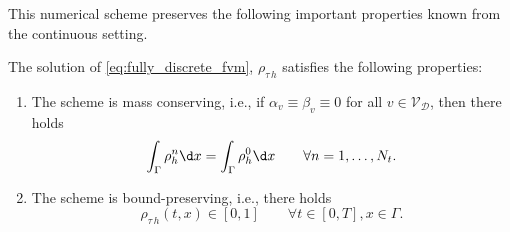This numerical scheme preserves the following important properties known from the continuous setting.
\begin{theorem}
    The solution of \eqref{eq:fully_discrete_fvm}, $\rho_{\tau\,h}$ satisfies the following properties:
    \begin{enumerate}[label=\roman*)]
        \item The scheme is mass conserving, i.e., if $\alpha_v\equiv \beta_v\equiv 0$ for all $v\in \mathcal{V}_{\mathcal{D}}$, then there holds
        \begin{equation*}
            \int_\Gamma\rho_h^n\d x = \int_\Gamma\rho_h^0\d x\qquad\forall n=1,\ldots,N_t.
        \end{equation*}
        \item The scheme is bound-preserving, i.e., there holds
        \begin{equation*}
            \rho_{\tau\,h}(t,x)\in [0,1]\qquad \forall t\in [0,T],
            x\in \Gamma.
        \end{equation*}
    \end{enumerate}
\end{theorem}


